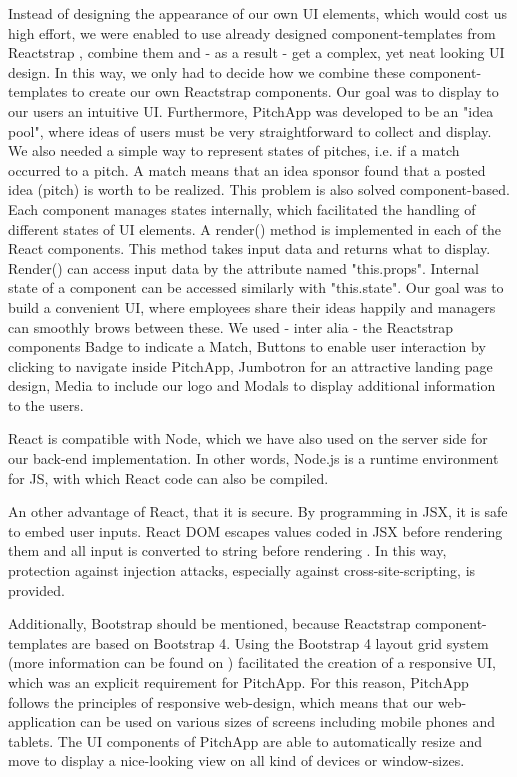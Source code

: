 Instead of designing the appearance of our own UI elements, which would cost us high effort, we were enabled to use already designed component-templates from Reactstrap \parencite{Reactstrap_comp}, combine them and - as a result - get a complex, yet neat looking UI design. In this way, we only had to decide how we combine these component-templates to create our own Reactstrap components. Our goal was to display to our users an intuitive UI. Furthermore, PitchApp was developed to be an "idea pool", where ideas of users must be very straightforward to collect and display. We also needed a simple way to represent states of pitches, i.e. if a match occurred to a pitch. A match means that an idea sponsor found that a posted idea (pitch) is worth to be realized. This problem is also solved component-based. Each component manages states internally, which facilitated the handling of different states of UI elements. A render() method is implemented in each of the React components. This method takes input data and returns what to display. Render() can access input data by the attribute named "this.props". Internal state of a component can be accessed similarly with "this.state". Our goal was to build a convenient UI, where employees share their ideas happily and managers can smoothly brows between these. We used - inter alia - the Reactstrap components Badge to indicate a Match, Buttons to enable user interaction by clicking to navigate inside PitchApp, Jumbotron for an attractive landing page design, Media to include our logo and Modals to display additional information to the users.

React is compatible with Node, which we have also used on the server side for our back-end implementation. In other words, Node.js is a runtime environment for JS, with which React code can also be compiled.

An other advantage of React, that it is secure. By programming in JSX, it is safe to embed user inputs. React DOM escapes values coded in JSX before rendering them and all input is converted to string before rendering \parencite{JSX}. In this way, protection against injection attacks, especially against cross-site-scripting, is provided.

Additionally, Bootstrap \parencite{Bootstrap} should be mentioned, because Reactstrap component-templates are based on Bootstrap 4. Using the Bootstrap 4 layout grid system (more information can be found on \parencite{Bootstrap_grid}) facilitated the creation of a responsive UI, which was an explicit requirement for PitchApp. For this reason, PitchApp follows the principles of responsive web-design, which means that our web-application can be used on various sizes of screens including mobile phones and tablets. The UI components of PitchApp are able to automatically resize and move to display a nice-looking view on all kind of devices or window-sizes.

